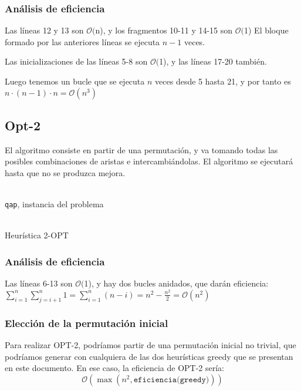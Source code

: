 \documentclass[a4paper, 11pt]{article} %
\newcommand{\ef}[1]{$\mathcal{O}#1$}
\begin{document}
\subsubsection{Análisis de eficiencia}
Las líneas 12 y 13 son \ef(n), y los fragmentos 10-11 y 14-15 son \ef(1)
El bloque formado por las anteriores líneas se ejecuta $n-1$ veces.

Las inicializaciones de las líneas 5-8 son \ef(1), y las líneas 17-20 también.

Luego tenemos un bucle que se ejecuta $n$ veces desde 5 hasta 21, y por tanto
es $n\cdot(n-1)\cdot n = \mathcal{O}(n^3)$

\subsection{Opt-2}
El algoritmo consiste en partir de una permutación, y va tomando todas las posibles
combinaciones de aristas e intercambiándolas. El algoritmo se ejecutará
hasta que no se produzca mejora.
\begin{algorithm}[H]
	\begin{algorithmic}[1]
		\REQUIRE \ \\
        	\texttt{qap}, instancia del problema \\\
	      \STATE{\texttt{old\_cost=qap.cost}}
	      \ELSE
	      \ENDIF  
	  \ENDFOR
	\ENDFOR
	\ENDWHILE
	\end{algorithmic}
    \caption{Heurística 2-OPT}
    \label{opt2}
\end{algorithm}  

\subsubsection{Análisis de eficiencia}
Las líneas 6-13 son \ef(1), y hay dos bucles anidados, que darán eficiencia:
$\sum_{i=1}^{n} \sum_{j=i+1}^{n} 1 = \sum_{i=1}^{n} (n-i)= n^2-\frac{n^2}{2}=\mathcal{O}(n^2)$

\subsubsection{Elección de la permutación inicial}
Para realizar OPT-2, podríamos partir de una permutación inicial no trivial,
que podríamos generar con cualquiera de las dos heurísticas greedy que se presentan
en este documento. En ese caso, la eficiencia de OPT-2 sería:
$$\mathcal{O}(\max(n^2,\texttt{eficiencia(greedy)}))$$
\end{document}
